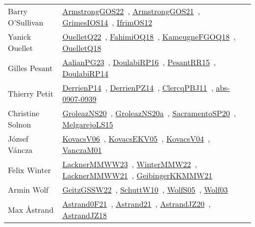 {\begin{longtable}{p{4cm}p{20cm}}
Barry O'Sullivan & \href{works/ArmstrongGOS22.pdf}{ArmstrongGOS22}~\cite{ArmstrongGOS22}, \href{works/ArmstrongGOS21.pdf}{ArmstrongGOS21}~\cite{ArmstrongGOS21}, \href{works/GrimesIOS14.pdf}{GrimesIOS14}~\cite{GrimesIOS14}, \href{works/IfrimOS12.pdf}{IfrimOS12}~\cite{IfrimOS12}\\
Yanick Ouellet & \href{works/OuelletQ22.pdf}{OuelletQ22}~\cite{OuelletQ22}, \href{works/FahimiOQ18.pdf}{FahimiOQ18}~\cite{FahimiOQ18}, \href{works/KameugneFGOQ18.pdf}{KameugneFGOQ18}~\cite{KameugneFGOQ18}, \href{works/OuelletQ18.pdf}{OuelletQ18}~\cite{OuelletQ18}\\
Gilles Pesant & \href{works/AalianPG23.pdf}{AalianPG23}~\cite{AalianPG23}, \href{}{DoulabiRP16}~\cite{DoulabiRP16}, \href{works/PesantRR15.pdf}{PesantRR15}~\cite{PesantRR15}, \href{works/DoulabiRP14.pdf}{DoulabiRP14}~\cite{DoulabiRP14}\\
Thierry Petit & \href{works/DerrienP14.pdf}{DerrienP14}~\cite{DerrienP14}, \href{works/DerrienPZ14.pdf}{DerrienPZ14}~\cite{DerrienPZ14}, \href{works/ClercqPBJ11.pdf}{ClercqPBJ11}~\cite{ClercqPBJ11}, \href{works/abs-0907-0939.pdf}{abs-0907-0939}~\cite{abs-0907-0939}\\
Christine Solnon & \href{works/GroleazNS20.pdf}{GroleazNS20}~\cite{GroleazNS20}, \href{works/GroleazNS20a.pdf}{GroleazNS20a}~\cite{GroleazNS20a}, \href{works/SacramentoSP20.pdf}{SacramentoSP20}~\cite{SacramentoSP20}, \href{works/MelgarejoLS15.pdf}{MelgarejoLS15}~\cite{MelgarejoLS15}\\
J{\'{o}}zsef V{\'{a}}ncza & \href{works/KovacsV06.pdf}{KovacsV06}~\cite{KovacsV06}, \href{works/KovacsEKV05.pdf}{KovacsEKV05}~\cite{KovacsEKV05}, \href{works/KovacsV04.pdf}{KovacsV04}~\cite{KovacsV04}, \href{works/VanczaM01.pdf}{VanczaM01}~\cite{VanczaM01}\\
Felix Winter & \href{works/LacknerMMWW23.pdf}{LacknerMMWW23}~\cite{LacknerMMWW23}, \href{works/WinterMMW22.pdf}{WinterMMW22}~\cite{WinterMMW22}, \href{works/LacknerMMWW21.pdf}{LacknerMMWW21}~\cite{LacknerMMWW21}, \href{works/GeibingerKKMMW21.pdf}{GeibingerKKMMW21}~\cite{GeibingerKKMMW21}\\
Armin Wolf & \href{works/GeitzGSSW22.pdf}{GeitzGSSW22}~\cite{GeitzGSSW22}, \href{works/SchuttW10.pdf}{SchuttW10}~\cite{SchuttW10}, \href{works/WolfS05.pdf}{WolfS05}~\cite{WolfS05}, \href{works/Wolf03.pdf}{Wolf03}~\cite{Wolf03}\\
Max {\AA}strand & \href{works/Astrand0F21.pdf}{Astrand0F21}~\cite{Astrand0F21}, \href{}{Astrand21}~\cite{Astrand21}, \href{works/AstrandJZ20.pdf}{AstrandJZ20}~\cite{AstrandJZ20}, \href{works/AstrandJZ18.pdf}{AstrandJZ18}~\cite{AstrandJZ18}\\

\end{longtable}}

